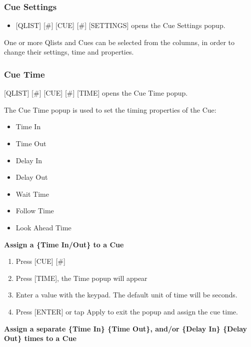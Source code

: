 \documentclass[
]{article}
\providecommand{\tightlist}{%
  \setlength{\itemsep}{0pt}\setlength{\parskip}{0pt}}
\begin{document}
\hypertarget{cue-settings-1}{%
\subsubsection{Cue Settings}\label{cue-settings-1}}

\begin{itemize}
\tightlist
\item
  {[}QLIST{]} {[}\#{]} {[}CUE{]} {[}\#{]} {[}SETTINGS{]} opens the Cue Settings popup.
\end{itemize}

One or more Qlists and Cues can be selected from the columns, in order to change their settings, time and properties.

\hypertarget{cue-time}{%
\subsubsection{Cue Time}\label{cue-time}}

{[}QLIST{]} {[}\#{]} {[}CUE{]} {[}\#{]} {[}TIME{]} opens the Cue Time popup.

The Cue Time popup is used to set the timing properties of the Cue:

\begin{itemize}
\item
  Time In
\item
  Time Out
\item
  Delay In
\item
  Delay Out
\item
  Wait Time
\item
  Follow Time
\item
  Look Ahead Time
\end{itemize}

\textbf{Assign a \{Time In/Out\} to a Cue}

\begin{enumerate}
\def\labelenumi{\arabic{enumi}.}
\item
  Press {[}CUE{]} {[}\#{]}
\item
  Press {[}TIME{]}, the Time popup will appear
\item
  Enter a value with the keypad. The default unit of time will be seconds.
\item
  Press {[}ENTER{]} or tap Apply to exit the popup and assign the cue time.
\end{enumerate}

\textbf{Assign a separate \{Time In\} \{Time Out\}, and/or \{Delay In\} \{Delay Out\} times to a Cue}
\end{document}

